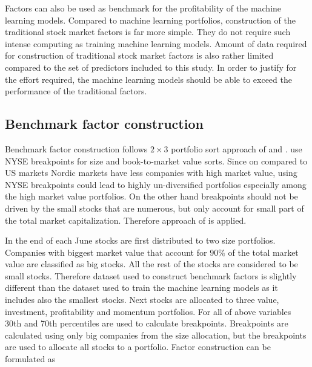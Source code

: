 \documentclass[12pt]{article}
\begin{document}
Factors can also be used as benchmark for the profitability of the machine learning models. Compared to machine learning portfolios, construction of the traditional stock market factors is far more simple. They do not require such intense computing as training machine learning models. Amount of data required for construction of traditional stock market factors is also rather limited compared to the set of predictors included to this study. In order to justify for the effort required, the machine learning models should be able to exceed the performance of the traditional factors.

\subsection{Benchmark factor construction}\label{BenchmarkFactorsConstruction}

Benchmark factor construction follows $2 \times 3$ portfolio sort approach of \citet{FAMA19933, FAMA20151} and \citet{Carhart1997}. \citet{FAMA19933} use NYSE breakpoints for size and book-to-market value sorts. Since on compared to US markets Nordic markets have less companies with high market value, using NYSE breakpoints could lead to highly un-diversified portfolios especially among the high market value portfolios. On the other hand breakpoints should not be driven by the small stocks that are numerous, but only account for small part of the total market capitalization. Therefore approach of \citet{FAMA2012457} is applied.  \par

In the end of each June stocks are first distributed to two size portfolios. Companies with biggest market value that account for $90\%$ of the total market value are classified as big stocks. All the rest of the stocks are considered to be small stocks. Therefore dataset used to construct benchmark factors is slightly different than the dataset used to train the machine learning models as it includes also the smallest stocks. Next stocks are allocated to three value, investment, profitability and momentum portfolios. For all of above variables 30th and 70th percentiles are used to calculate breakpoints. Breakpoints are calculated using only big companies from the size allocation, but the breakpoints are used to allocate all stocks to a portfolio. Factor construction can be formulated as \par
\end{document}
